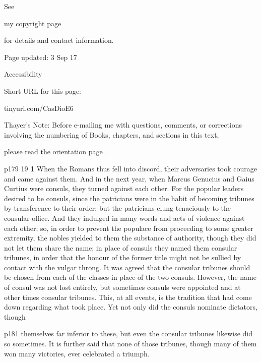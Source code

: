 See

my copyright page

for details and contact information.

Page updated:
3 Sep 17

Accessibility


Short URL for this page:

tinyurl.com/CasDioE6

Thayer's Note: Before e-mailing me with questions, comments, or corrections involving the numbering of Books, chapters, and sections in this text,

please read the orientation page .

p179
19
\textbf{1} When the Romans thus fell into discord, their adversaries took courage and came against them. And in the next year, when Marcus Genucius and Gaius Curtius were consuls, they turned against each other. For the popular leaders desired to be consuls, since the patricians were in the habit of becoming tribunes by transference to their order; but the patricians clung tenaciously to the consular office. And they indulged in many words and acts of violence against each other; so, in order to prevent the populace from proceeding to some greater extremity, the nobles yielded to them the substance of authority, though they did not let them share the name; in place of consuls they named them consular tribunes, in order that the honour of the former title might not be sullied by contact with the vulgar throng. It was agreed that the consular tribunes should be chosen from each of the classes in place of the two consuls. However, the name of consul was not lost entirely, but sometimes consuls were appointed and at other times consular tribunes. This, at all events, is the tradition that had come down regarding what took place. Yet not only did the consuls nominate dictators, though

p181 themselves far inferior to these, but even the consular tribunes likewise did so sometimes. It is further said that none of those tribunes, though many of them won many victories, ever celebrated a triumph.

